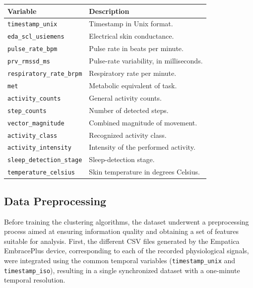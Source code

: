 \documentclass[a4paper,fleqn]{cas-sc}
\begin{document}
\begin{center}
\label{tab:dataset_variables}
\small
\begin{tabular*}{.95\textwidth}{@{} p{.38\linewidth} p{.52\linewidth} @{} }
\toprule
\textbf{Variable} & \textbf{Description} \\
\midrule
\texttt{timestamp\_unix} & Timestamp in Unix format. \\
\texttt{eda\_scl\_usiemens} & Electrical skin conductance. \\
\texttt{pulse\_rate\_bpm} & Pulse rate in beats per minute. \\
\texttt{prv\_rmssd\_ms} & Pulse-rate variability, in milliseconds. \\
\texttt{respiratory\_rate\_brpm} & Respiratory rate per minute. \\
\texttt{met} & Metabolic equivalent of task. \\
\texttt{activity\_counts} & General activity counts. \\
\texttt{step\_counts} & Number of detected steps. \\
\texttt{vector\_magnitude} & Combined magnitude of movement. \\
\texttt{activity\_class} & Recognized activity class. \\
\texttt{activity\_intensity} & Intensity of the performed activity. \\
\texttt{sleep\_detection\_stage} & Sleep-detection stage. \\
\texttt{temperature\_celsius} & Skin temperature in degrees Celsius. \\
\bottomrule
\end{tabular*}
\end{center}

\subsection{Data Preprocessing}

Before training the clustering algorithms, the dataset underwent a preprocessing process aimed at ensuring information quality and obtaining a set of features suitable for analysis. First, the different CSV files generated by the Empatica EmbracePlus device, corresponding to each of the recorded physiological signals, were integrated using the common temporal variables (\texttt{timestamp\_unix} and \texttt{timestamp\_iso}), resulting in a single synchronized dataset with a one-minute temporal resolution.
\end{document}
